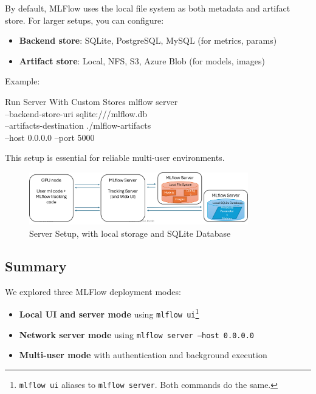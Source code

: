 By default, MLFlow uses the local file system as both metadata and artifact store. For larger setups, you can configure:

\begin{itemize}
    \item \textbf{Backend store}: SQLite, PostgreSQL, MySQL (for metrics, params)
    \item \textbf{Artifact store}: Local, NFS, S3, Azure Blob (for models, images)
\end{itemize}


Example:

\begin{codeonly}{Run Server With Custom Stores}
mlflow server \\
  --backend-store-uri sqlite:///mlflow.db \\
  --artifacts-destination ./mlflow-artifacts \\
  --host 0.0.0.0 --port 5000
\end{codeonly}

This setup is essential for reliable multi-user environments.

\begin{figure}[htbp]
    \centering
    \includegraphics[width=0.85\textwidth]{images/mlflow_server_setup.png}
    \caption{Server Setup, with local storage and SQLite Database}
    \label{fig:mlflow_auth}
\end{figure}

%
\subsection{Summary}

We explored three MLFlow deployment modes:

\begin{itemize}
    \item \textbf{Local UI and server mode} using \texttt{mlflow ui}\footnote{\texttt{mlflow ui} aliases to \texttt{mlflow server}. Both commands do the same.}
    \item \textbf{Network server mode} using \texttt{mlflow server --host 0.0.0.0}
    \item \textbf{Multi-user mode} with authentication and background execution
\end{itemize}

